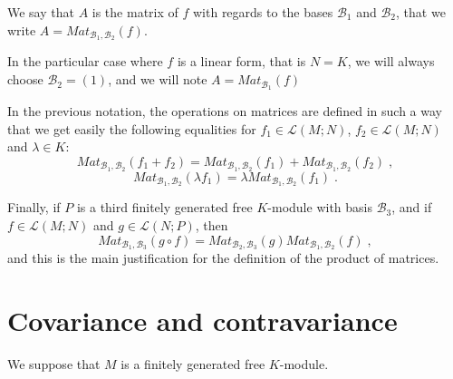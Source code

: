 \documentclass{report}
\theoremstyle{definition}
\theoremstyle{remark}
\begin{document}
We say that $A$ is the matrix of $f$ with regards to the bases $\mathcal{B}_1$ and $\mathcal{B}_2$, that we write $A=Mat_{\mathcal{B}_1,\mathcal{B}_2}(f)$. 

In the particular case where $f$ is a linear form, that is $N=K$, we will always choose $\mathcal{B}_2=(1)$, and we will note $A=Mat_{\mathcal{B}_1}(f)$

\bigskip
In the previous notation, the operations on matrices are defined in such a way that we get easily the following equalities for $f_1 \in \mathcal{L}(M;N)$, $f_2 \in\mathcal{L}(M;N)$ and $\lambda \in  K$:
$$Mat_{\mathcal{B}_1,\mathcal{B}_2}(f_1+f_2)=Mat_{\mathcal{B}_1,\mathcal{B}_2}(f_1)+Mat_{\mathcal{B}_1,\mathcal{B}_2}(f_2)\;,$$
$$Mat_{\mathcal{B}_1,\mathcal{B}_2}(\lambda f_1)=\lambda Mat_{\mathcal{B}_1,\mathcal{B}_2}(f_1)\;.$$

Finally, if $P$ is a third finitely generated free $K$-module with basis $\mathcal{B}_3$, and if $f \in\mathcal{L}(M;N)$ and $g \in\mathcal{L}(N;P)$, then
$$Mat_{\mathcal{B}_1,\mathcal{B}_3}(g \circ f)= Mat_{\mathcal{B}_2,\mathcal{B}_3}(g)Mat_{\mathcal{B}_1,\mathcal{B}_2}(f)\;,$$
and this is the main justification for the definition of the product of matrices.


  \section{Covariance and contravariance}\label{covariance}
 \medskip
    We suppose that $M$ is a finitely generated free $K$-module.
 
\end{document}
